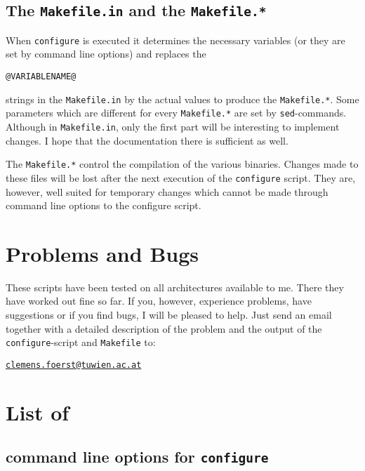 \documentclass[a4paper,10pt]{article}
\begin{document}
\subsection{The \texttt{Makefile.in} and the \texttt{Makefile.*}}

When \texttt{configure} is executed it determines the necessary variables (or they are set by command line options) and replaces the
\begin{verbatim}
@VARIABLENAME@
\end{verbatim}
strings in the \texttt{Makefile.in} by the actual values to produce the
\texttt{Makefile.*}.  Some parameters which are different for every
\texttt{Makefile.*} are set by \texttt{sed}-commands.  Although in
\texttt{Makefile.in}, only the first part will be interesting to implement
changes.  I hope that the documentation there is sufficient as well.

The \texttt{Makefile.*} control the compilation of the various binaries.
Changes made to these files will be lost after the next execution of the
\texttt{configure} script.  They are, however, well suited for temporary
changes which cannot be made through command line options to the configure script.




\section{Problems and Bugs}

These scripts have been tested on all architectures available to me.  There
they have worked out fine so far.  If you, however, experience problems, have suggestions or if you find
bugs, I will be pleased to help.  Just send an email together with a detailed
description of the problem and the output of the \texttt{configure}-script and \texttt{Makefile} to:

\underline{\texttt{clemens.foerst@tuwien.ac.at}}

\clearpage
\section*{List of}

\subsection*{command line options for \texttt{configure}}
\end{document}
